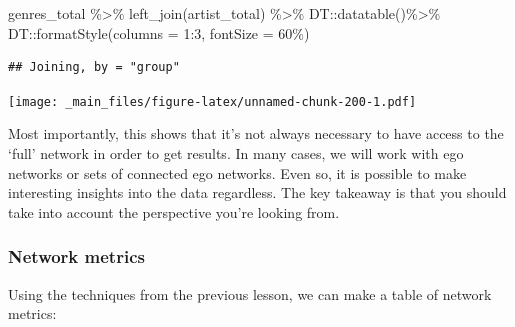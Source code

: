 \documentclass[
]{book}
\newenvironment{Shaded}{\begin{snugshade}}{\end{snugshade}}
\newcommand{\AttributeTok}[1]{\textcolor[rgb]{0.77,0.63,0.00}{#1}}
\newcommand{\DecValTok}[1]{\textcolor[rgb]{0.00,0.00,0.81}{#1}}
\newcommand{\FunctionTok}[1]{\textcolor[rgb]{0.00,0.00,0.00}{#1}}
\newcommand{\NormalTok}[1]{#1}
\newcommand{\SpecialCharTok}[1]{\textcolor[rgb]{0.00,0.00,0.00}{#1}}
\newcommand{\StringTok}[1]{\textcolor[rgb]{0.31,0.60,0.02}{#1}}
\begin{document}
\begin{Shaded}
\begin{Highlighting}[]
\NormalTok{genres\_total }\SpecialCharTok{\%\textgreater{}\%} \FunctionTok{left\_join}\NormalTok{(artist\_total) }\SpecialCharTok{\%\textgreater{}\%}\NormalTok{ DT}\SpecialCharTok{::}\FunctionTok{datatable}\NormalTok{()}\SpecialCharTok{\%\textgreater{}\%}
\NormalTok{  DT}\SpecialCharTok{::}\FunctionTok{formatStyle}\NormalTok{(}\AttributeTok{columns =} \DecValTok{1}\SpecialCharTok{:}\DecValTok{3}\NormalTok{, }\AttributeTok{fontSize =} \StringTok{\textquotesingle{}60\%\textquotesingle{}}\NormalTok{)}
\end{Highlighting}
\end{Shaded}

\begin{verbatim}
## Joining, by = "group"
\end{verbatim}

\texttt{[image: \_main\_files/figure-latex/unnamed-chunk-200-1.pdf]}

Most importantly, this shows that it's not always necessary to have access to the `full' network in order to get results. In many cases, we will work with ego networks or sets of connected ego networks. Even so, it is possible to make interesting insights into the data regardless. The key takeaway is that you should take into account the perspective you're looking from.

\hypertarget{network-metrics}{%
\subsubsection{Network metrics}\label{network-metrics}}

Using the techniques from the previous lesson, we can make a table of network metrics:
\end{document}
